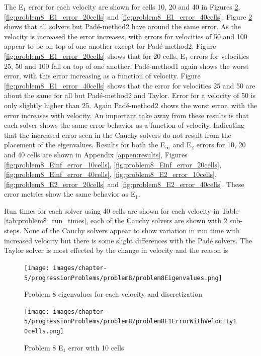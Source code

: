 The E${}_{1}$ error for each velocity are shown for cells 10, 20 and 40 in Figures \ref{fig:problem8_E1_error_10cells}, \ref{fig:problem8_E1_error_20cells} and \ref{fig:problem8_E1_error_40cells}. Figure \ref{fig:problem8_E1_error_10cells} shows that all solvers but Pad\'e-method2 have around the same error. As the velocity is increased the error increases, with errors for velocities of 50 and 100 appear to be on top of one another except for Pad\'e-method2. Figure \ref{fig:problem8_E1_error_20cells} shows that for 20 cells, E${}_{1}$ errors for velocities 25, 50 and 100 fall on top of one another. Pad\'e-method1 again shows the worst error, with this error increasing as a function of velocity. Figure \ref{fig:problem8_E1_error_40cells} shows that the error for velocities 25 and 50 are about the same for all but Pad\'e-method2 and Taylor. Error for a velocity of 50 is only slightly higher than 25. Again Pad\'e-method2 shows the worst error, with the error increases with velocity. An important take away from these results is that each solver shows the same error behavior as a function of velocity. Indicating that the increased error seen in the Cauchy solvers do not result from the placement of the eigenvalues. Results for both the E${}_{\infty}$ and E${}_{2}$ errors for 10, 20 and 40 cells are shown in Appendix \ref{appen:results}, Figures \ref{fig:problem8_Einf_error_10cells}, \ref{fig:problem8_Einf_error_20cells}, \ref{fig:problem8_Einf_error_40cells}, \ref{fig:problem8_E2_error_10cells}, \ref{fig:problem8_E2_error_20cells} and \ref{fig:problem8_E2_error_40cells}. These error metrics show the same behavior as E${}_{1}$. 

Run times for each solver using 40 cells are shown for each velocity in Table \ref{tab:problem8_run_times}, each of the Cauchy solvers are shown with 2 sub-steps. None of the Cauchy solvers appear to show variation in run time with increased velocity but there is some slight differences with the Pad\'e solvers. The Taylor solver is most effected by the change in velocity and the reason is 

\clearpage

\begin{figure}[p]
    \centering
    \texttt{[image: images/chapter-5/progressionProblems/problem8/problem8Eigenvalues.png]}
    \caption{Problem 8 eigenvalues for each velocity and discretization}
    \label{fig:problem8_eigenvalues}
\end{figure}

\clearpage

\begin{figure}[p]
    \centering
    \texttt{[image: images/chapter-5/progressionProblems/problem8/problem8E1ErrorWithVelocity10cells.png]}
    \caption{Problem 8 E${}_{1}$ error with 10 cells}
    \label{fig:problem8_E1_error_10cells}
\end{figure}

